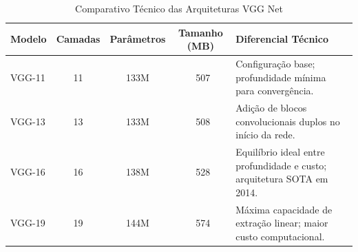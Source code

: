 \begin{table}[ht]
\centering
\caption{Comparativo Técnico das Arquiteturas VGG Net}
\label{tab:vgg_comparativo}
\begin{tabular}{@{}lccc p{6cm}@{}}
\toprule
\textbf{Modelo} & \textbf{Camadas} & \textbf{Parâmetros} & \textbf{Tamanho (MB)} & \textbf{Diferencial Técnico} \\ \midrule
VGG-11 & 11 & 133M & ~507 & Configuração base; profundidade mínima para convergência. \\
VGG-13 & 13 & 133M & ~508 & Adição de blocos convolucionais duplos no início da rede. \\
VGG-16 & 16 & 138M & ~528 & Equilíbrio ideal entre profundidade e custo; arquitetura SOTA em 2014. \\
VGG-19 & 19 & 144M & ~574 & Máxima capacidade de extração linear; maior custo computacional. \\ \bottomrule
\end{tabular}
\end{table}